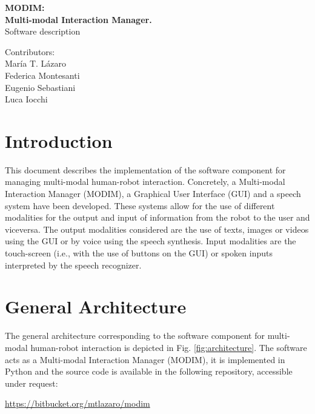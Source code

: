 \documentclass[11pt,a4paper]{article}
\begin{document}
\begin{titlepage}
\thispagestyle{empty}

\vspace{10cm}
{\huge\center \bfseries  MODIM: }
\\
{\huge\center \bfseries Multi-modal Interaction Manager.}\\

{\huge\center Software description}

\vspace{5cm}
\begin{flushright}
{\large Contributors:\\
Mar\'ia T. L\'azaro\\
Federica Montesanti\\
Eugenio Sebastiani\\
Luca Iocchi}
\end{flushright}
\vfill


\end{titlepage}



\newpage
\section{Introduction}
This document describes the implementation of the software component for managing multi-modal human-robot interaction. 
Concretely, a Multi-modal Interaction Manager (MODIM), a Graphical User Interface (GUI) and a speech system have been developed. These systems allow for the use of different modalities for the output and input of information from the robot to the user and viceversa. The output modalities considered are the use of texts, images or videos using the GUI or by voice using the speech synthesis. Input modalities are the touch-screen (i.e., with the use of buttons on the GUI) or spoken inputs interpreted by the speech recognizer.

\section{General Architecture}
The general architecture corresponding to the software component for multi-modal human-robot interaction is depicted in Fig. \ref{fig:architecture}. The software acts as a Multi-modal Interaction Manager (MODIM), it is implemented in Python and the source code is available in the following repository, accessible under request:
\begin{center}
  \url{https://bitbucket.org/mtlazaro/modim}
\end{center}
\end{document}
